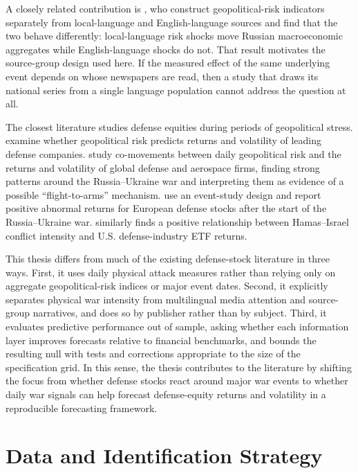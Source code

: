 \documentclass[12pt,a4paper]{article}
\begin{document}
A closely related contribution is \citet{bondarenko2024perceptions}, who construct geopolitical-risk indicators separately from local-language and English-language sources and find that the two behave differently: local-language risk shocks move Russian macroeconomic aggregates while English-language shocks do not. That result motivates the source-group design used here. If the measured effect of the same underlying event depends on whose newspapers are read, then a study that draws its national series from a single language population cannot address the question at all.

The closest literature studies defense equities during periods of geopolitical stress. \citet{apergis2018defense} examine whether geopolitical risk predicts returns and volatility of leading defense companies. \citet{zhang2022race} study co-movements between daily geopolitical risk and the returns and volatility of global defense and aerospace firms, finding strong patterns around the Russia--Ukraine war and interpreting them as evidence of a possible ``flight-to-arms'' mechanism. \citet{covachev2024europe} use an event-study design and report positive abnormal returns for European defense stocks after the start of the Russia--Ukraine war. \citet{klomp2025hamas} similarly finds a positive relationship between Hamas--Israel conflict intensity and U.S. defense-industry ETF returns.

This thesis differs from much of the existing defense-stock literature in three ways. First, it uses daily physical attack measures rather than relying only on aggregate geopolitical-risk indices or major event dates. Second, it explicitly separates physical war intensity from multilingual media attention and source-group narratives, and does so by publisher rather than by subject. Third, it evaluates predictive performance out of sample, asking whether each information layer improves forecasts relative to financial benchmarks, and bounds the resulting null with tests and corrections appropriate to the size of the specification grid. In this sense, the thesis contributes to the literature by shifting the focus from whether defense stocks react around major war events to whether daily war signals can help forecast defense-equity returns and volatility in a reproducible forecasting framework.

\section{Data and Identification Strategy}
\end{document}

